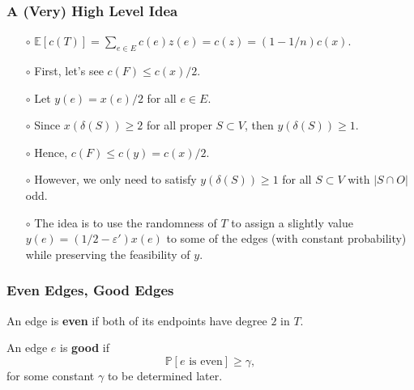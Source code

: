 \documentclass{beamer}
\newcommand{\EE}{\mathbb{E}}
\newcommand{\PP}{\mathbb{P}}
\begin{document}
  \begin{frame}
    \frametitle{A (Very) High Level Idea}

    \pause
  
    \begin{enumerate}
      \item[$\circ$] $\EE[c(T)] = \sum_{e \in E} c(e) z(e) = c(z) = (1 - 1/n) c(x)$. \pause
      \item[$\circ$] First, let's see $c(F) \leq c(x)/2$. \pause
      \item[$\circ$] Let $y(e) = x(e)/2$ for all $e \in E$. \pause
      \item[$\circ$] Since $x(\delta(S)) \geq 2$ for all proper $S \subset V$, then $y(\delta(S)) \geq 1$. \pause
      \item[$\circ$] Hence, $c(F) \leq c(y) = c(x)/2$. \pause
      \item[$\circ$] However, we only need to satisfy $y(\delta(S)) \geq 1$ for all $S \subset V$ with $|S \cap O|$ odd. \pause
      \item[$\circ$] The idea is to use the randomness of $T$ to assign a slightly value $y(e) = (1/2 - \varepsilon') x(e)$ to some of the edges (with constant probability) while preserving the feasibility of $y$.
    \end{enumerate}
  
  \end{frame}

  \begin{frame}
    \frametitle{Even Edges, Good Edges}
  
    \begin{definition}
      An edge is {\bf even} if both of its endpoints have degree $2$ in $T$.
    \end{definition}

    \pause

    \begin{definition}
      An edge $e$ is {\bf good} if
      $$ \PP[\text{$e$ is even}] \geq \gamma, $$
      for some constant $\gamma$ to be determined later.
    \end{definition}
  
  \end{frame}
\end{document}
